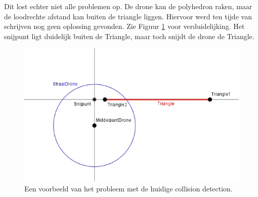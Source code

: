 \noindent
Dit lost echter niet alle problemen op. De drone kan de polyhedron raken, maar de loodrechte afstand kan buiten de triangle liggen. Hiervoor werd ten tijde van schrijven nog geen oplossing gevonden. Zie Figuur \ref{fig:CollisionDetectionProbleem} voor verduidelijking. Het snijpunt ligt duidelijk buiten de Triangle, maar toch snijdt de drone de Triangle.
\begin{figure}[h]
	\includegraphics[width=1\textwidth]{CollisionDetectionProbleem.png}
	\caption{Een voorbeeld van het probleem met de huidige collision detection.\\ }
	\label{fig:CollisionDetectionProbleem}
\end{figure}